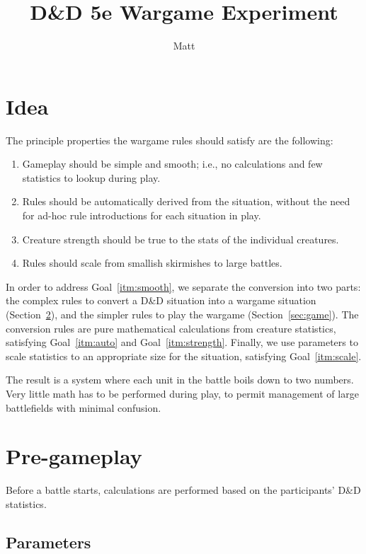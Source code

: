 \documentclass[twocolumn]{article}
\begin{document}
\title{D\&D 5e Wargame Experiment}
\author{Matt}
\maketitle

\section{Idea}

The principle properties the wargame rules should satisfy are the following:
\begin{enumerate}
    \item \label{itm:smooth} Gameplay should be simple and smooth;
        i.e., no calculations and few statistics to lookup during play.
    \item \label{itm:auto} Rules should be automatically derived from the situation,
        without the need for ad-hoc rule introductions for each situation in play.
    \item \label{itm:strength} Creature strength should be true to the stats of the individual creatures.
    \item \label{itm:scale} Rules should scale from smallish skirmishes to large battles.
\end{enumerate}

In order to address Goal~\ref{itm:smooth}, we separate the conversion into two parts:
the complex rules to convert a D\&D situation into a wargame situation (Section~\ref{sec:pregame}),
and the simpler rules to play the wargame (Section~\ref{sec:game}).
The conversion rules are pure mathematical calculations from creature statistics,
satisfying Goal~\ref{itm:auto} and Goal~\ref{itm:strength}.
Finally, we use parameters to scale statistics to an appropriate size for the situation,
satisfying Goal~\ref{itm:scale}.

The result is a system where each unit in the battle boils down to two numbers.
Very little math has to be performed during play,
to permit management of large battlefields
with minimal confusion.

\section{Pre-gameplay}\label{sec:pregame}

Before a battle starts,
calculations are performed based on the participants' D\&D statistics.

\subsection{Parameters}
\end{document}
